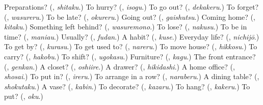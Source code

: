 \begin{tcolorbox}[breakable,colback=teal!4,colframe=teal!35!black,title={Before you move on}]
Preparations? (\textbf{}, \emph{shitaku}.) To hurry? (\textbf{}, \emph{isogu}.) To go out? (\textbf{}, \emph{dekakeru}.) To forget? (\textbf{}, \emph{wasureru}.) To be late? (\textbf{}, \emph{okureru}.) Going out? (\textbf{}, \emph{gaishutsu}.) Coming home? (\textbf{}, \emph{kitaku}.) Something left behind? (\textbf{}, \emph{wasuremono}.) To lose? (\textbf{}, \emph{nakusu}.) To be in time? (\textbf{}, \emph{maniau}.) Usually? (\textbf{}, \emph{fudan}.) A habit? (\textbf{}, \emph{kuse}.) Everyday life? (\textbf{}, \emph{nichijō}.) To get by? (\textbf{}, \emph{kurasu}.) To get used to? (\textbf{}, \emph{nareru}.) To move house? (\textbf{}, \emph{hikkosu}.) To carry? (\textbf{}, \emph{hakobu}.) To shift? (\textbf{}, \emph{ugokasu}.) Furniture? (\textbf{}, \emph{kagu}.) The front entrance? (\textbf{}, \emph{genkan}.) A closet? (\textbf{}, \emph{oshiire}.) A drawer? (\textbf{}, \emph{hikidashi}.) A home office? (\textbf{}, \emph{shosai}.) To put in? (\textbf{}, \emph{ireru}.) To arrange in a row? (\textbf{}, \emph{naraberu}.) A dining table? (\textbf{}, \emph{shokutaku}.) A vase? (\textbf{}, \emph{kabin}.) To decorate? (\textbf{}, \emph{kazaru}.) To hang? (\textbf{}, \emph{kakeru}.) To put? (\textbf{}, \emph{oku}.)
\end{tcolorbox}
